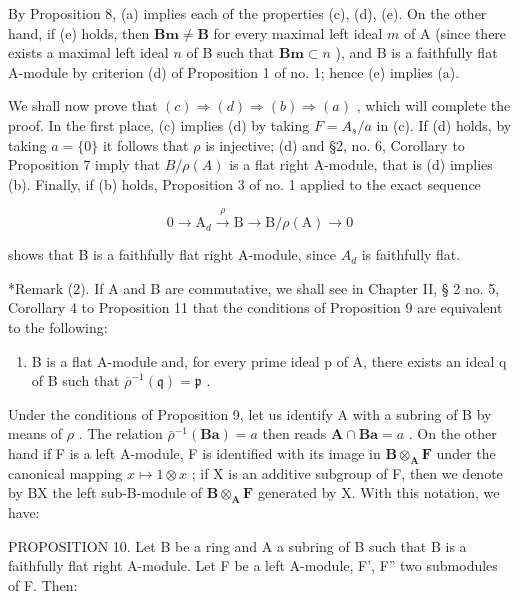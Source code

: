By Proposition 8, (a) implies each of the properties (c), (d), (e). On the other hand, if (e) holds, then \(\mathbf{Bm} \neq \mathbf{B}\) for every maximal left ideal \(m\) of A (since there exists a maximal left ideal \(n\) of B such that \(\mathbf{Bm} \subset n\) ), and B is a faithfully flat A-module by criterion (d) of Proposition 1 of no. 1; hence (e) implies (a).

We shall now prove that \((c) \Rightarrow (d) \Rightarrow (b) \Rightarrow (a)\) , which will complete the proof. In the first place, (c) implies (d) by taking \(F = A_{s}/a\) in (c). If (d) holds, by taking \(a = \{0\}\) it follows that \(\rho\) is injective; (d) and §2, no. 6, Corollary to Proposition 7 imply that \(B/\rho(A)\) is a flat right A-module, that is (d) implies (b). Finally, if (b) holds, Proposition 3 of no. 1 applied to the exact sequence

\[
0 \longrightarrow \mathrm{A} _ {d} \stackrel {\rho} {\longrightarrow} \mathrm{B} \longrightarrow \mathrm{B} / \rho (\mathrm{A}) \longrightarrow 0
\]

shows that B is a faithfully flat right A-module, since \(A_{d}\) is faithfully flat.

*Remark (2). If A and B are commutative, we shall see in Chapter II, § 2 no. 5, Corollary 4 to Proposition 11 that the conditions of Proposition 9 are equivalent to the following:

\begin{enumerate}
\def\labelenumi{(\alph{enumi})}
\setcounter{enumi}{5}
\tightlist
\item
  B is a flat A-module and, for every prime ideal p of A, there exists an ideal q of B such that \(\overline{\rho}^{-1}(\mathfrak{q}) = \mathfrak{p}\) .
\end{enumerate}

Under the conditions of Proposition 9, let us identify A with a subring of B by means of \(\rho\) . The relation \(\bar{\rho}^{-1}(\mathbf{Ba}) = a\) then reads \(\mathbf{A} \cap \mathbf{Ba} = a\) . On the other hand if F is a left A-module, F is identified with its image in \(\mathbf{B} \otimes_{\mathbf{A}} \mathbf{F}\) under the canonical mapping \(x \mapsto 1 \otimes x\) ; if X is an additive subgroup of F, then we denote by BX the left sub-B-module of \(\mathbf{B} \otimes_{\mathbf{A}} \mathbf{F}\) generated by X. With this notation, we have:

PROPOSITION 10. Let B be a ring and A a subring of B such that B is a faithfully flat right A-module. Let F be a left A-module, F', F'' two submodules of F. Then:

